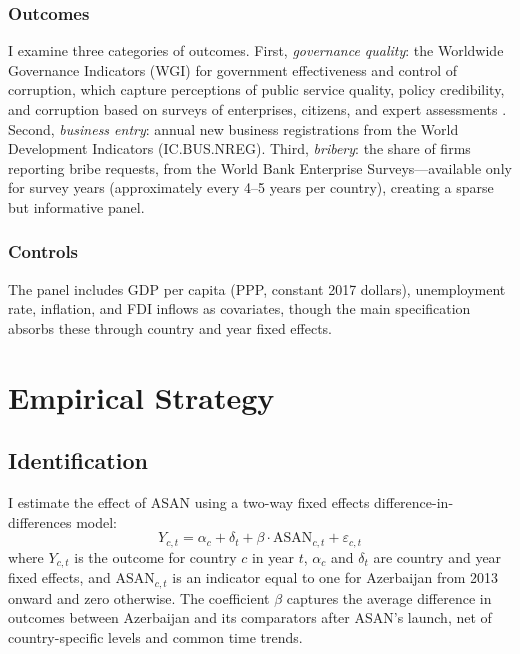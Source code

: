 \documentclass[12pt]{article}
\begin{document}
\subsubsection*{Outcomes} I examine three categories of outcomes. First, \textit{governance quality}: the Worldwide Governance Indicators (WGI) for government effectiveness and control of corruption, which capture perceptions of public service quality, policy credibility, and corruption based on surveys of enterprises, citizens, and expert assessments \citep{kaufmann2011worldwide}. Second, \textit{business entry}: annual new business registrations from the World Development Indicators (IC.BUS.NREG). Third, \textit{bribery}: the share of firms reporting bribe requests, from the World Bank Enterprise Surveys---available only for survey years (approximately every 4--5 years per country), creating a sparse but informative panel.

\subsubsection*{Controls} The panel includes GDP per capita (PPP, constant 2017 dollars), unemployment rate, inflation, and FDI inflows as covariates, though the main specification absorbs these through country and year fixed effects.




\section{Empirical Strategy}

\subsection{Identification}

I estimate the effect of ASAN using a two-way fixed effects difference-in-differences model:
\begin{equation}
Y_{c,t} = \alpha_c + \delta_t + \beta \cdot \text{ASAN}_{c,t} + \varepsilon_{c,t}
\label{eq:did}
\end{equation}
where $Y_{c,t}$ is the outcome for country $c$ in year $t$, $\alpha_c$ and $\delta_t$ are country and year fixed effects, and $\text{ASAN}_{c,t}$ is an indicator equal to one for Azerbaijan from 2013 onward and zero otherwise. The coefficient $\beta$ captures the average difference in outcomes between Azerbaijan and its comparators after ASAN's launch, net of country-specific levels and common time trends.
\end{document}
